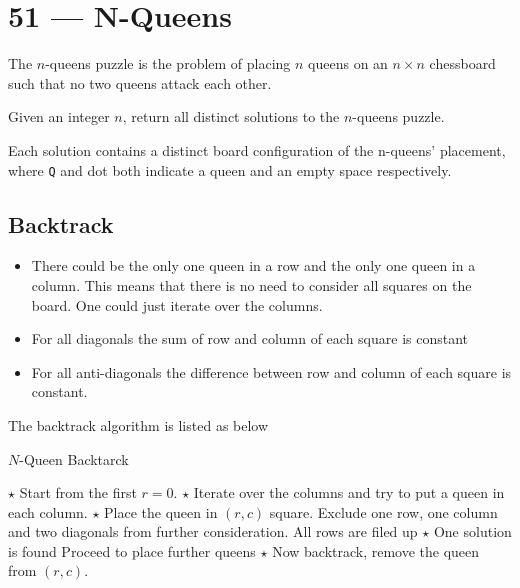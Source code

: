 \section{51 --- N-Queens}
The $n$-queens puzzle is the problem of placing $n$ queens on an $n\times n$ chessboard such that no two queens attack each other.


Given an integer $n$, return all distinct solutions to the $n$-queens puzzle.

Each solution contains a distinct board configuration of the n-queens' placement, where \texttt{Q} and dot both indicate a queen and an empty space respectively.

\subsection{Backtrack}
\begin{itemize}
\item There could be the only one queen in a row and the only one queen in a column. This means that there is no need to consider all squares on the board. One could just iterate over the columns.
\item For all diagonals the sum of row and column of each square is constant
\item For all anti-diagonals the difference between row and column of each square is constant.
\end{itemize}

The backtrack algorithm is listed as below

\setcounter{algorithm}{0}
\begin{algorithm}[H]
\caption{$N$-Queen Backtarck}
\begin{algorithmic}[1]
\State $\star$ Start from the first $r = 0$.
\State $\star$ Iterate over the columns and try to put a queen in each column.
\State $\star$ Place the queen in $(r, c)$ square.
\State Exclude one row, one column and two diagonals from further consideration.
 \Comment All rows are filed up
\State $\star$ One solution is found
\Else
\State {} \Comment Proceed to place further queens 
\EndIf
\State $\star$ Now backtrack, remove the queen from $(r,c)$.
\EndIf
\EndProcedure
\end{algorithmic}
\end{algorithm}

